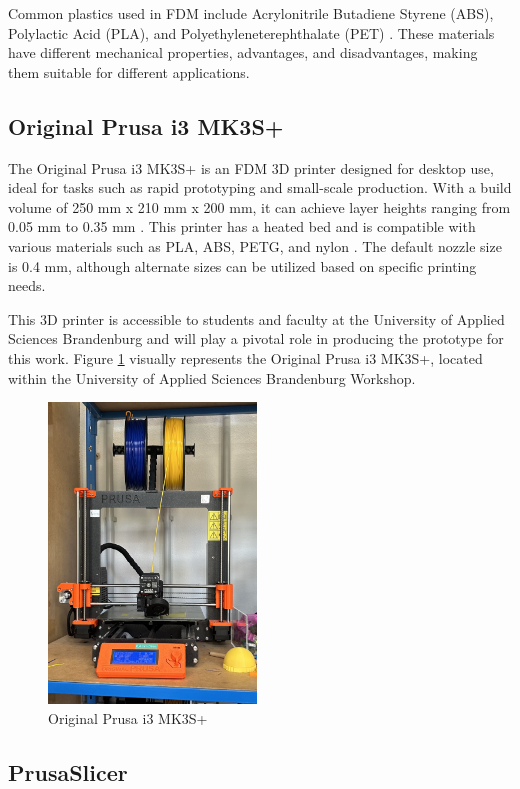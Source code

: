 Common plastics used in FDM include Acrylonitrile Butadiene Styrene (ABS), Polylactic Acid (PLA), and Polyethyleneterephthalate (PET) \cite{Teamm17}. These materials have different mechanical properties, advantages, and disadvantages, making them suitable for different applications.

\subsection{Original Prusa i3 MK3S+}
\label{subsec:prusa_slicer_mk3s}
The Original Prusa i3 MK3S+ is an FDM 3D printer designed for desktop use, ideal for tasks such as rapid prototyping and small-scale production. With a build volume of 250 mm x 210 mm x 200 mm, it can achieve layer heights ranging from 0.05 mm to 0.35 mm \cite{Prusa}. This printer has a heated bed and is compatible with various materials such as PLA, ABS, PETG, and nylon \cite{Prusa}. The default nozzle size is 0.4 mm, although alternate sizes can be utilized based on specific printing needs.

This 3D printer is accessible to students and faculty at the University of Applied Sciences Brandenburg and will play a pivotal role in producing the prototype for this work. Figure \ref{fig:prusa_slicer_mk3} visually represents the Original Prusa i3 MK3S+, located within the University of Applied Sciences Brandenburg Workshop.

\begin{figure}
    \centering
    \includegraphics[height=8cm]{texs/Part1/chapter1/image/prusa.jpg}
    \caption{Original Prusa i3 MK3S+}
    \label{fig:prusa_slicer_mk3}
\end{figure}

\subsection{PrusaSlicer}
\label{subsec:prusa_slicer}

